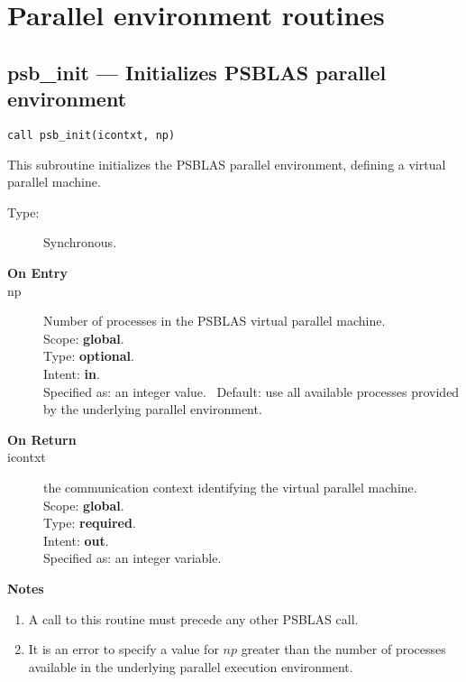 
\section{Parallel environment routines}
\label{sec:parenv}

\clearpage\subsection*{psb\_init --- Initializes PSBLAS parallel environment}

\begin{verbatim}
call psb_init(icontxt, np)
\end{verbatim}

This subroutine initializes the PSBLAS parallel environment, defining
a virtual parallel machine.
\begin{description}
\item[Type:] Synchronous.
\item[\bf  On Entry ]
\item[np] Number of processes in the PSBLAS virtual parallel machine.\\
Scope: {\bf global}.\\
Type: {\bf optional}.\\
Intent: {\bf in}.\\
Specified as: an integer value. \
Default: use all available processes provided by the underlying
parallel environment.
\end{description}

\begin{description}
\item[\bf On Return]
\item[icontxt] the communication context identifying the virtual
  parallel machine.\\
Scope: {\bf global}.\\
Type: {\bf required}.\\
Intent: {\bf out}.\\
Specified as: an integer variable.
\end{description}


{\par\noindent\large\bfseries Notes}
\begin{enumerate}
\item A call to this routine must precede any other PSBLAS call. 
\item It is an error to specify a value for $np$ greater than the
  number of processes available in the underlying parallel execution
  environment. 
\end{enumerate}


